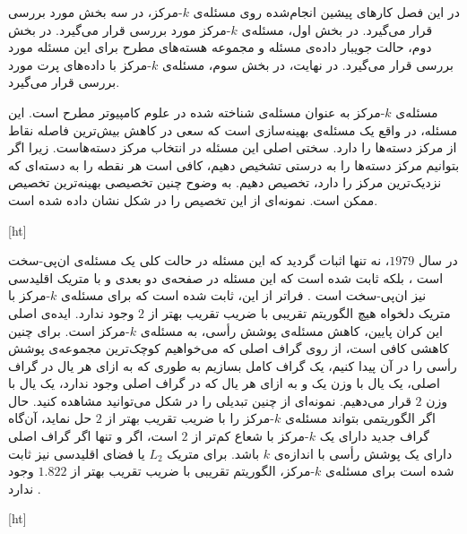 

در این فصل کارهای پیشین انجام‌شده روی مسئله‌ی $k$-مرکز، در سه بخش مورد بررسی قرار می‌گیرد. در بخش اول، مسئله‌ی $k$-مرکز مورد بررسی قرار می‌گیرد. در بخش دوم، حالت جویبار داده‌ی مسئله و مجموعه هسته‌های مطرح برای این مسئله مورد بررسی قرار می‌گیرد. در نهایت، در بخش سوم، مسئله‌ی $k$-مرکز‌ با داده‌های پرت مورد بررسی قرار می‌گیرد.


مسئله‌ی $k$-مرکز‌ به عنوان مسئله‌ی شناخته شده در علوم کامپیوتر مطرح است. این مسئله، در واقع یک مسئله‌ی بهینه‌سازی است که سعی در کاهش بیش‌ترین فاصله نقاط از مرکز دسته‌ها را دارد. سختی اصلی این مسئله در انتخاب مرکز دسته‌هاست. زیرا اگر بتوانیم مرکز دسته‌ها را به درستی تشخیص دهیم، کافی است هر نقطه را به دسته‌ای که نزدیک‌ترین مرکز  را دارد، تخصیص دهیم. به وضوح چنین تخصیصی بهینه‌ترین تخصیص ممکن است. نمونه‌ای از این تخصیص را در شکل  نشان داده شده است.

[ht]

در سال $1979$، نه تنها اثبات گردید که این مسئله در حالت کلی یک مسئله‌ی ان‌پی-سخت است ، بلکه ثابت شده است که این مسئله در صفحه‌ی دو بعدی و با متریک اقلیدسی نیز‌ ان‌پی-سخت است . فراتر از این، ثابت شده است که برای مسئله‌ی $k$-مرکز  با متریک دلخواه هیچ الگوریتم تقریبی با ضریب تقریب بهتر از $2$ وجود ندارد. ایده‌ی اصلی این کران پایین، کاهش مسئله‌ی پوشش‌ رأسی، به مسئله‌ی $k$-مرکز است. برای چنین کاهشی کافی است، از روی گراف اصلی که می‌خواهیم کوچک‌ترین مجموعه‌ی پوشش‌ رأسی را در آن پیدا کنیم، یک گراف کامل بسازیم به طوری که به ازای هر یال در گراف اصلی، یک یال با وزن یک و به ازای هر یال که در گراف اصلی وجود ندارد، یک یال با وزن $2$ قرار می‌دهیم. نمونه‌ای از چنین تبدیلی را در شکل  می‌توانید مشاهده کنید. حال اگر الگوریتمی بتواند مسئله‌ی $k$-مرکز را با ضریب تقریب بهتر از $2$ حل نماید، آن‌گاه گراف جدید دارای یک $k$-مرکز با شعاع کم‌تر از $2$ است، اگر و تنها اگر گراف اصلی دارای یک پوشش‌ رأسی با اندازه‌ی $k$ باشد. برای متریک $L_2$ یا فضای اقلیدسی نیز‌‌ ثابت شده است برای مسئله‌ی $k$-مرکز، الگوریتم تقریبی با ضریب تقریب بهتر از $1.822$ وجود ندارد .

[ht]


